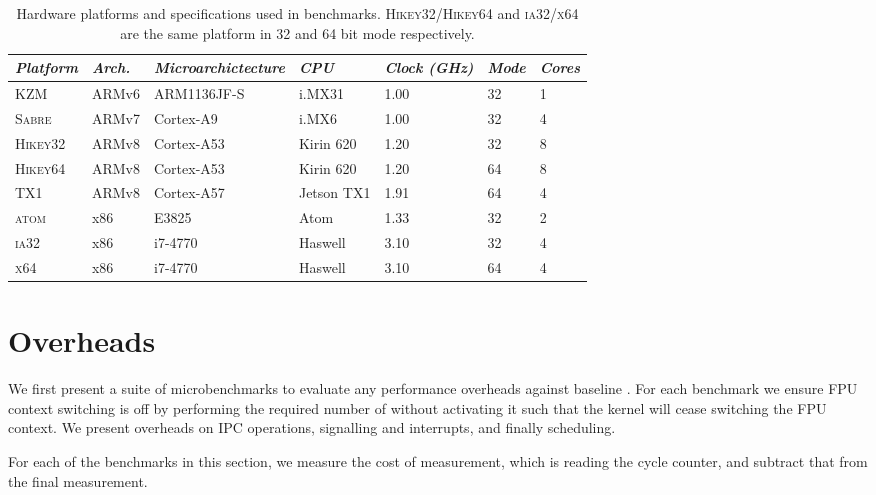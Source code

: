 \begin{table}[ht]
\begin{tabular}{*7l}\toprule
    \emph{Platform} & \emph{Arch.} & \emph{Microarchictecture} & \emph{CPU} & \emph{Clock (GHz)} &
    \emph{Mode} & \emph{Cores} \\\midrule
    \textsc{KZM}  & ARMv6          & ARM1136JF-S          & i.MX31       & 1.00         & 32  &  1 \\
    \textsc{Sabre} & ARMv7          & Cortex-A9           & i.MX6        & 1.00         & 32  & 4 \\
    \textsc{Hikey32} & ARMv8          & Cortex-A53          & Kirin 620    & 1.20         & 32  & 8 \\
    \textsc{Hikey64} & ARMv8          & Cortex-A53          & Kirin 620    & 1.20         & 64  & 8 \\
    \textsc{TX1}  & ARMv8          & Cortex-A57          & Jetson TX1   & 1.91        & 64  & 4 \\
    \textsc{atom} & x86            & E3825               & Atom         & 1.33         & 32  & 2 \\
    \textsc{ia32} & x86            & i7-4770             & Haswell      & 3.10         & 32  & 4 \\
    \textsc{x64}  & x86            & i7-4770             & Haswell      & 3.10         & 64  & 4
\\\bottomrule\hline
\end{tabular}
\caption{Hardware platforms and specifications used in benchmarks. \textsc{Hikey32/Hikey64}
    and \textsc{ia32/x64} are the
same platform in 32 and 64 bit mode respectively.}
\label{t:evaluation-hardware}
\end{table}

\section{Overheads}

We first present a suite of microbenchmarks to evaluate any performance overheads against baseline
\selfour.
For each benchmark we ensure \gls{FPU} context switching is off by performing the required number of
without activating it such that the kernel will cease switching the FPU context. We present
overheads on IPC operations, signalling and interrupts, and finally scheduling. 

For each of the benchmarks in this section, we measure the cost of measurement, which is reading the
cycle counter, and subtract that from the final measurement.

